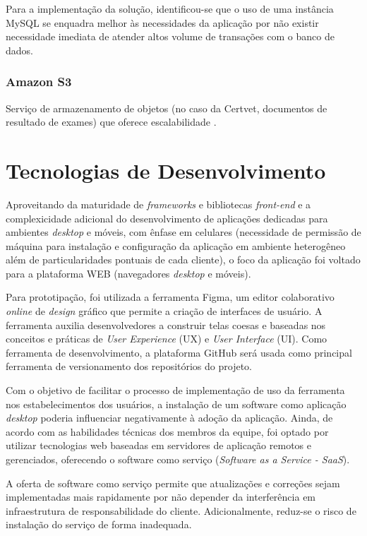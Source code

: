 \documentclass[
    12pt,               %
    openright,          %
    oneside,
    a4paper,            %
    BIBLATEX,           %
    TODO,               %
    english,            %
    brazil              %
    ]{ifsp-spo-inf-ctds}
\begin{document}
            Para a implementação da solução, identificou-se que o uso de uma instância MySQL se enquadra melhor às necessidades da aplicação por não existir necessidade imediata de atender altos volume de transações com o banco de dados.

        \subsubsection{Amazon S3}

            Serviço de armazenamento de objetos (no caso da Certvet, documentos de resultado de exames) que oferece escalabilidade . 

    \section{Tecnologias de Desenvolvimento}

        Aproveitando da maturidade de \emph{frameworks} e bibliotecas \emph{front-end} e a complexicidade adicional do desenvolvimento de aplicações dedicadas para ambientes \emph{desktop} e móveis, com ênfase em celulares (necessidade de permissão de máquina para instalação e configuração da aplicação em ambiente heterogêneo além de particularidades pontuais de cada cliente), o foco da aplicação foi voltado para a plataforma WEB (navegadores \emph{desktop} e móveis).

        Para prototipação, foi utilizada a ferramenta Figma, um editor colaborativo \emph{online} de \emph{design} gráfico que permite a criação de interfaces de usuário. A ferramenta auxilia desenvolvedores a construir telas coesas e baseadas nos conceitos e práticas de \emph{User Experience} (UX) e \emph{User Interface }(UI). Como ferramenta de desenvolvimento, a plataforma GitHub será usada como principal ferramenta de versionamento dos  repositórios do projeto.

        Com o objetivo de facilitar o processo de implementação de uso da ferramenta nos estabelecimentos dos usuários, a instalação de um software como aplicação \emph{desktop} poderia influenciar negativamente à adoção da aplicação. Ainda, de acordo com as habilidades técnicas dos membros da equipe, foi optado por utilizar tecnologias web baseadas em servidores de aplicação remotos e gerenciados, oferecendo o software como serviço (\emph{Software as a Service - SaaS}).

        A oferta de software como serviço permite que atualizações e correções sejam implementadas mais rapidamente por não depender da interferência em infraestrutura de responsabilidade do cliente. Adicionalmente, reduz-se o risco de instalação do serviço de forma inadequada.
\end{document}
